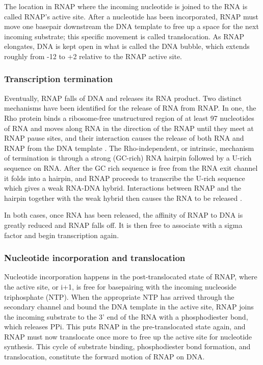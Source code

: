 The location in RNAP where the incoming nucleotide is joined to the RNA is
called RNAP's active site. After a nucleotide has been incorporated, RNAP must
move one basepair downstream the DNA template to free up a space for the next
incoming substrate; this specific movement is called translocation. As RNAP
elongates, DNA is kept open in what is called the DNA bubble, which extends
roughly from -12 to +2 relative to the RNAP active site.

\subsubsection{Transcription termination}
Eventually, RNAP falls of DNA and releases its RNA product. Two distinct
mechanisms have been identified for the release of RNA from RNAP. In one, the Rho
protein binds a ribosome-free unstructured region of at least 97 nucleotides of
RNA and moves along RNA in the direction of the RNAP until they meet at RNAP
pause sites, and their interaction causes the release of both RNA and RNAP from
the DNA template \cite{ciampi_rho-dependent_2006}. The
Rho-independent, or intrinsic, mechanism of termination is through a strong
(GC-rich) RNA hairpin followed by a U-rich sequence on RNA. After the GC rich
sequence is free from the RNA exit channel it folds into a hairpin, and
RNAP proceeds to transcribe the U-rich sequence which gives a weak RNA-DNA
hybrid. Interactions between RNAP and the hairpin together with the weak hybrid
then causes the RNA to be released \cite{nudler_transcription_2002}.

In both cases, once RNA has been released, the affinity of RNAP to DNA is
greatly reduced and RNAP falls off. It is then free to associate with a
sigma factor and begin transcription again.

\subsubsection{Nucleotide incorporation and translocation}
Nucleotide incorporation happens in the post-translocated state of RNAP, where
the active site, or i+1, is free for basepairing with the incoming nucleoside
triphosphate (NTP). When the appropriate NTP has arrived through the secondary
channel and bound the DNA template in the active site, RNAP joins the incoming
substrate to the 3' end of the RNA with a phosphodiester bond, which releases
PPi. This puts RNAP in the pre-translocated state again, and RNAP must now
translocate once more to free up the active site for nucleotide synthesis. This
cycle of substrate binding, phosphodiester bond formation, and translocation,
constitute the forward motion of RNAP on DNA.

